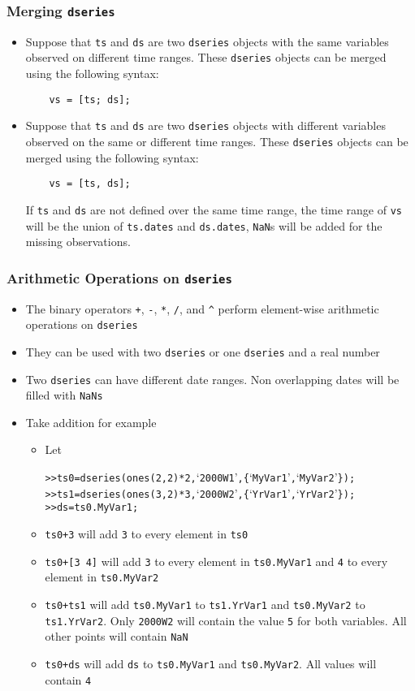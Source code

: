 \documentclass[10pt]{beamer}
\newcommand{\myitem}{\item[$\bullet$]}
\begin{document}
\begin{frame}[fragile,t]
  \frametitle{Merging \texttt{dseries}}
  \begin{itemize}
    \myitem Suppose that \verb+ts+ and \verb+ds+ are two \texttt{dseries} objects
    with the same variables observed on different time ranges. These
    \texttt{dseries} objects can be merged using the following syntax:
\begin{verbatim}
    vs = [ts; ds];
\end{verbatim}
\myitem Suppose that \verb+ts+ and \verb+ds+ are two \texttt{dseries} objects
with different variables observed on the same or different time ranges. These
\texttt{dseries} objects can be merged using the following syntax:
\begin{verbatim}
    vs = [ts, ds];
\end{verbatim}
If \verb+ts+ and \verb+ds+ are not defined over the same time range,
the time range of \verb+vs+ will be the union of \verb+ts.dates+ and
\verb+ds.dates+, \verb+NaN+s will be added for the missing observations.
  \end{itemize}
\end{frame}


\begin{frame}[fragile,t]
  \frametitle{Arithmetic Operations on \texttt{dseries}}
  \begin{itemize}
    \myitem The binary operators \texttt{+}, \texttt{-}, \texttt{*},
    \texttt{/}, and \texttt{\string^} perform element-wise arithmetic operations on
    \texttt{dseries}
    \myitem They can be used with two \texttt{dseries} or one \texttt{dseries}
    and a real number
    \myitem Two \texttt{dseries} can have different date ranges. Non overlapping dates will be filled with \texttt{NaNs}
    \myitem Take addition for example
    \begin{itemize}
      \myitem Let
    \begin{alltt}
>> ts0 = dseries(ones(2,2)*2, `2000W1', \{`MyVar1', `MyVar2'\});
>> ts1 = dseries(ones(3,2)*3, `2000W2', \{`YrVar1', `YrVar2'\});
>> ds = ts0.MyVar1;
    \end{alltt}
    \myitem \texttt{ts0+3} will add \texttt{3} to every element in \texttt{ts0}
    \myitem \texttt{ts0+[3 4]} will add \texttt{3} to every element in \texttt{ts0.MyVar1} and \texttt{4} to every element in \texttt{ts0.MyVar2}
    \myitem \texttt{ts0+ts1} will add \texttt{ts0.MyVar1} to \texttt{ts1.YrVar1} and \texttt{ts0.MyVar2} to \texttt{ts1.YrVar2}. Only \texttt{2000W2} will contain the value \texttt{5} for both variables. All other points will contain \texttt{NaN}
    \myitem \texttt{ts0+ds} will add \texttt{ds} to \texttt{ts0.MyVar1} and \texttt{ts0.MyVar2}. All values will contain \texttt{4}
    \end{itemize}
  \end{itemize}
\end{frame}
\end{document}
